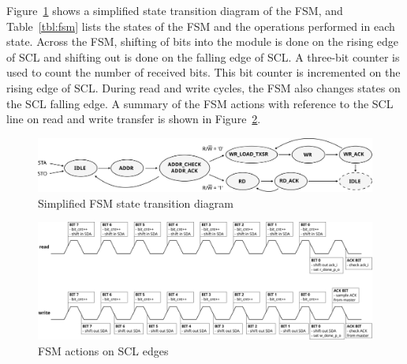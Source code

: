 \documentclass[a4paper,11pt]{article}
\begin{document}
Figure~\ref{fig:fsm-diag} shows a simplified state transition diagram of the FSM,
and Table~\ref{tbl:fsm} lists the states of the FSM and the operations performed in each
state. Across the FSM, shifting of bits into the module is done on the rising edge
of SCL and shifting out is done on the falling edge of SCL. A three-bit counter is
used to count the number of received bits. This bit counter is incremented on the
rising edge of SCL. During read and write cycles, the FSM also changes states on
the SCL falling edge. A summary of the FSM actions with reference to the SCL line
on read and write transfer is shown in Figure~\ref{fig:fsm-and-scl}.

\begin{figure}[h]
  \centerline{\includegraphics[width=\textwidth]{fig/fsm-diag}}
  \caption{Simplified FSM state transition diagram}
  \label{fig:fsm-diag}
\end{figure}

\begin{figure}[h]
  \centerline{\includegraphics[width=\textwidth]{fig/fsm-and-scl}}
  \caption{FSM actions on SCL edges}
  \label{fig:fsm-and-scl}
\end{figure}
\end{document}
